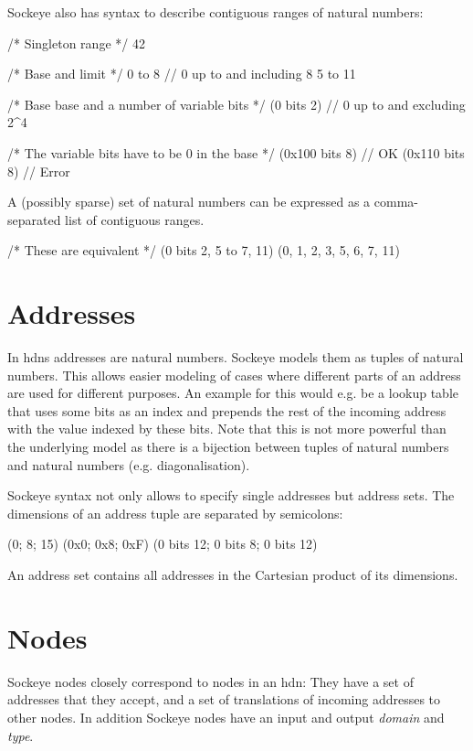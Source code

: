 \documentclass[a4paper,11pt,twoside]{report}
\begin{document}
{{{Sockeye also has syntax to describe contiguous ranges of natural numbers:
\begin{example}
  /* Singleton range */
  42

  /* Base and limit */
  0 to 8 // 0 up to and including 8
  5 to 11

  /* Base base and a number of variable bits */
  (0 bits 2) // 0 up to and excluding 2^4

  /* The variable bits have to be 0 in the base */
  (0x100 bits 8) // OK
  (0x110 bits 8) // Error
\end{example}

A (possibly sparse) set of natural numbers can be expressed as a comma-separated list of contiguous ranges.
\begin{example}
  /* These are equivalent */
  (0 bits 2, 5 to 7, 11)
  (0, 1, 2, 3, 5, 6, 7, 11)
\end{example}

\section{Addresses}
In \glspl{hdn} addresses are natural numbers.
Sockeye models them as tuples of natural numbers.
This allows easier modeling of cases where different parts of an address are used for different purposes.
An example for this would e.g. be a lookup table that uses some bits as an index and prepends the rest of the incoming address with the value indexed by these bits.
Note that this is not more powerful than the underlying model as there is a bijection between tuples of natural numbers and natural numbers (e.g. diagonalisation).

Sockeye syntax not only allows to specify single addresses but address sets.
The dimensions of an address tuple are separated by semicolons:
\begin{example}
  (0; 8; 15)
  (0x0; 0x8; 0xF)
  (0 bits 12; 0 bits 8; 0 bits 12)
\end{example}

An address set contains all addresses in the Cartesian product of its dimensions.

\section{Nodes}
Sockeye nodes closely correspond to nodes in an \gls{hdn}:
They have a set of addresses that they accept, and a set of translations of incoming addresses to other nodes.
In addition Sockeye nodes have an input and output \emph{domain} and \emph{type}.

}}}
\end{document}
